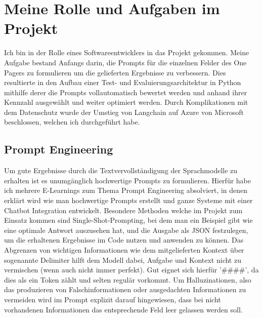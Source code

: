 \section{Meine Rolle und Aufgaben im Projekt}
Ich bin in der Rolle eines Softwareentwicklers in das Projekt gekommen. Meine Aufgabe bestand Anfangs darin, die Prompts
für die einzelnen Felder des One Pagers zu formulieren um die gelieferten Ergebnisse zu verbessern. Dies resultierte in
den Aufbau einer Test- und Evaluierungsarchitektur in Python mithilfe derer die Prompts vollautomatisch bewertet werden
und anhand ihrer Kennzahl ausgewählt und weiter optimiert werden. Durch Komplikationen mit dem Datenschutz wurde der
Umstieg von Langchain auf Azure von Microsoft beschlossen, welchen ich durchgeführt habe. 

\subsection{Prompt Engineering}
Um gute Ergebnisse durch die Textvervollständigung der Sprachmodelle zu erhalten ist es unumgänglich hochwertige Prompts
zu formulieren. Hierfür habe ich mehrere E-Learnings zum Thema Prompt Engineering absolviert, in denen erklärt wird wie
man hochwertige Prompts erstellt und ganze Systeme mit einer Chatbot Integration entwickelt. Besondere Methoden welche im
Projekt zum Einsatz kommen sind Single-Shot-Prompting, bei dem man ein Beispiel gibt wie eine optimale Antwort
auszusehen hat, und die Ausgabe als JSON festzulegen, um die erhaltenen Ergebnisse im Code nutzen und anwenden zu
können. Das Abgrenzen von wichtigen Informationen wie dem mitgelieferten Kontext über sogenannte Delimiter hilft dem
Modell dabei, Aufgabe und Kontext nicht zu vermischen (wenn auch nicht immer perfekt). Gut eignet sich hierfür
'\#\#\#\#', da dies als ein Token zählt und selten regulär vorkommt. Um Halluzinationen, also das produzieren von
Falschinformationen oder ausgedachten Informationen zu vermeiden wird im Prompt explizit darauf hingewiesen, dass bei
nicht vorhandenen Informationen das entsprechende Feld leer gelassen werden soll. 

